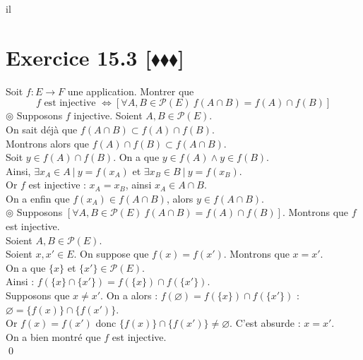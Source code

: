 il\documentclass[10pt]{article}
\begin{document}
\section*{Exercice 15.3 [$\blacklozenge\blacklozenge\blacklozenge$]}
\begin{tcolorbox}[enhanced, width=7.6in, center, size=fbox, fontupper=\large, drop shadow southwest]
    Soit $f:E\to F$ une application. Montrer que
    \begin{equation*}
        f \text{ est injective } \iff [\forall A,B \in \mathcal{P}(E) ~ f(A \cap B) = f(A) \cap f(B)]
    \end{equation*}
    $\circledcirc$ Supposons $f$ injective. Soient $A,B \in \mathcal{P}(E)$.\\
    On sait déjà que $f(A \cap B) \subset f(A) \cap f(B)$.\\
    Montrons alors que $f(A) \cap f(B) \subset f(A \cap B)$.\\
    Soit $y \in f(A) \cap f(B)$. On a que $y \in f(A) \wedge y \in f(B)$.\\
    Ainsi, $\exists x_A \in A ~ | ~ y = f(x_A)$ et $\exists x_B \in B ~ | ~ y = f(x_B)$.\\
    Or $f$ est injective : $x_A = x_B$, ainsi $x_A \in A \cap B$.\\
    On a enfin que $f(x_A) \in f(A \cap B)$, alors $y \in f(A \cap B)$.\\[0.2cm]
    $\circledcirc$ Supposons $[\forall A,B \in \mathcal{P}(E) ~ f(A \cap B) = f(A) \cap f(B)]$. Montrons que $f$ est injective.\\
    Soient $A,B \in \mathcal{P}(E)$.\\
    Soient $x,x' \in E$. On suppose que $f(x) = f(x')$. Montrons que $x = x'$.\\
    On a que $\{x\}$ et $\{x'\} \in \mathcal{P}(E)$.\\
    Ainsi : $f(\{x\} \cap \{x'\}) = f(\{x\}) \cap f(\{x'\})$.\\
    Supposons que $x \neq x'$. On a alors : $f(\varnothing) = f(\{x\}) \cap f(\{x'\})$ : $\varnothing = \{f(x)\} \cap \{f(x')\}$.\\
    Or $f(x) = f(x')$ donc $\{f(x)\} \cap \{f(x')\} \neq \varnothing$. C'est absurde : $x = x'$.\\
    On a bien montré que $f$ est injective.\\
    \qed 
\end{tcolorbox}
\end{document}
